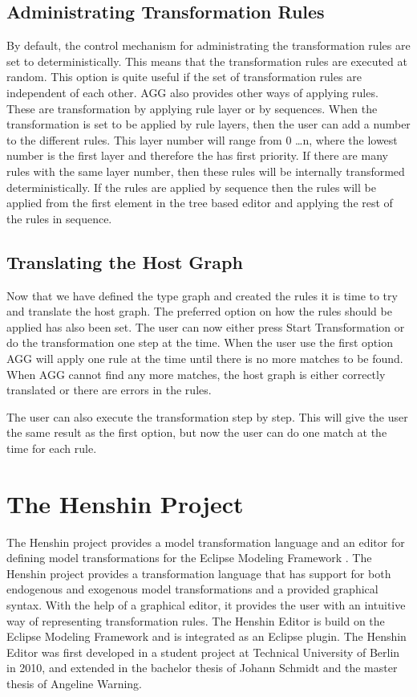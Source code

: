 \subsection{Administrating Transformation Rules}

By default, the control mechanism for administrating the transformation rules
are set to deterministically. This means that the transformation rules are
executed at random. This option is quite useful if the set of transformation
rules are independent of each other. AGG also provides other ways of applying
rules. These are transformation by applying rule layer or by sequences. When the
transformation is set to be applied by rule layers, then the user can add a
number to the different rules. This layer number will range from 0 \ldots n,
where the lowest number is the first layer and therefore the has first
priority. If there are many rules with the same layer number, then these rules
will be internally transformed deterministically. If the rules are applied
by sequence then the rules will be applied from the first element in the tree
based editor and applying the rest of the rules in sequence.

\subsection{Translating the Host Graph}

Now that we have defined the type graph and created the rules it is time to try
and translate the host graph. The preferred option on how the rules should be
applied has also been set. The user can now either press Start Transformation or
do the transformation one step at the time. When the user use the first option
AGG will apply one rule at the time until there is no more matches to be found.
When AGG cannot find any more matches, the host graph is either correctly
translated or there are errors in the rules. 

The user can also execute the transformation step by step. This will give the
user the same result as the first option, but now the user can do one match at
the time for each rule. 

\section{The Henshin Project}

The Henshin project\cite{Henshin} provides a model transformation
language and an editor for defining model transformations for the Eclipse
Modeling Framework \cite{Steinberg2009}. The Henshin project provides a
transformation language that has support for both endogenous and exogenous
model transformations and a provided graphical syntax. With the help of a
graphical editor, it provides the user with an intuitive way of representing
transformation rules. The Henshin Editor is build on the Eclipse Modeling
Framework and is integrated as an Eclipse plugin. The Henshin Editor was first
developed in a student project at Technical University of Berlin in 2010, and
extended in the bachelor thesis \cite{JohannSchmidt} of Johann Schmidt and the
master thesis \cite{AngelineWarning} of Angeline Warning.

